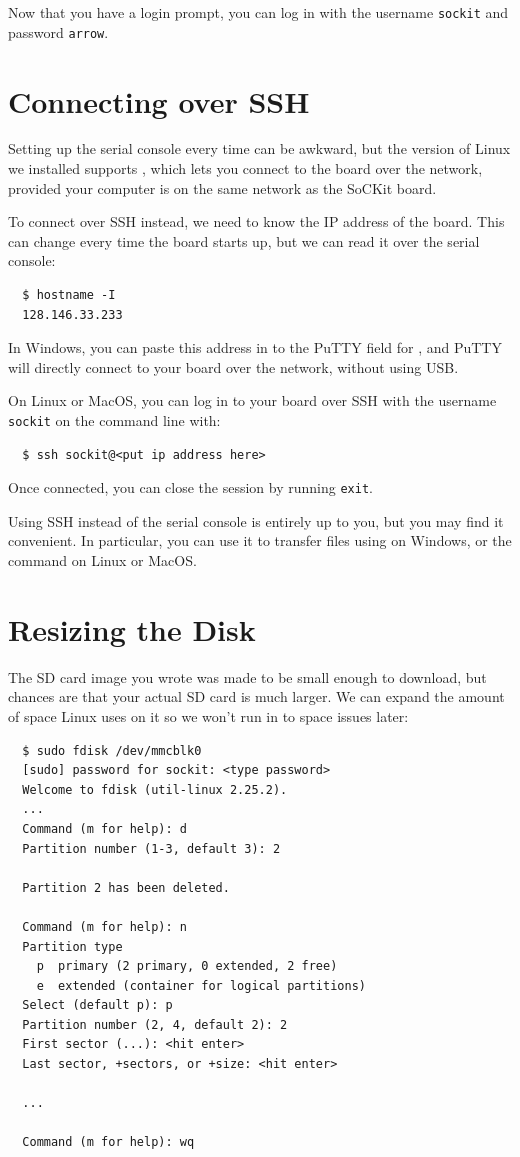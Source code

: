 \documentclass{sockitguide}
\begin{document}
Now that you have a login prompt, you can log in with the username
\texttt{sockit} and password \texttt{arrow}.

\section{Connecting over SSH}

Setting up the serial console every time can be awkward, but the
version of Linux we installed supports
, which lets
you connect to the board over the network, provided your computer is
on the same network as the SoCKit board.

To connect over SSH instead, we need to know the IP address of the
board. This can change every time the board starts up, but we can read
it over the serial console:
\begin{verbatim}
  $ hostname -I
  128.146.33.233
\end{verbatim}

In Windows, you can paste this address in to the PuTTY field for
, and PuTTY will directly connect to your board over the
network, without using USB.

On Linux or MacOS, you can log in to your board over SSH with the
username \texttt{sockit} on the command line with:
\begin{verbatim}
  $ ssh sockit@<put ip address here>
\end{verbatim}

Once connected, you can close the session by running \texttt{exit}.

Using SSH instead of the serial console is entirely up to you, but you
may find it convenient. In particular, you can use it to transfer
files using  on
Windows, or the 
command on Linux or MacOS.

\section{Resizing the Disk}

The SD card image you wrote was made to be small enough to download,
but chances are that your actual SD card is much larger. We can expand
the amount of space Linux uses on it so we won't run in to space
issues later:
\begin{verbatim}
  $ sudo fdisk /dev/mmcblk0
  [sudo] password for sockit: <type password>
  Welcome to fdisk (util-linux 2.25.2).
  ...
  Command (m for help): d
  Partition number (1-3, default 3): 2

  Partition 2 has been deleted.

  Command (m for help): n
  Partition type
    p  primary (2 primary, 0 extended, 2 free)
    e  extended (container for logical partitions)
  Select (default p): p
  Partition number (2, 4, default 2): 2
  First sector (...): <hit enter>
  Last sector, +sectors, or +size: <hit enter>

  ...

  Command (m for help): wq
\end{verbatim}
\end{document}
